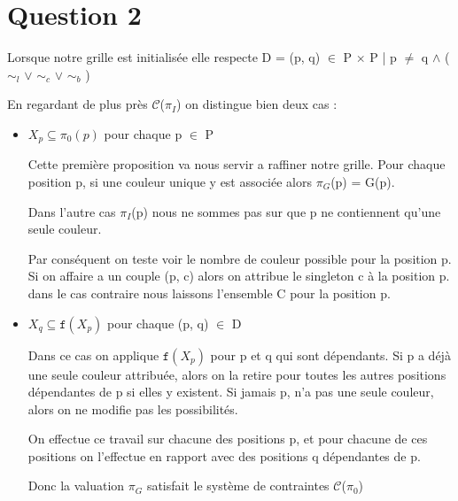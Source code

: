
\section{Question 2}

Lorsque notre grille est initialis\'ee elle respecte D = {(p, q) $\in$ P $\times$ P | p $\neq$ q $\wedge$ ( $\sim_{l}$ $\vee$ $\sim_{c}$ $\vee$ $\sim_{b}$ )}

En regardant de plus pr\`es $\mathcal{C}$($\pi_I$) on distingue bien deux cas :

\bigskip
\begin{itemize}
\item $X_p \subseteq \pi_0(p)$ pour chaque p $\in$ P

Cette premi\`ere proposition va nous servir a raffiner notre grille. Pour chaque position p, si une couleur unique y est associ\'ee alors $\pi_G$(p) = {G(p)}.


Dans l'autre cas $\pi_I$(p)  nous ne sommes pas sur que p ne contiennent qu'une seule couleur.  

\bigskip
Par cons\'equent on teste voir le nombre de couleur possible pour la position p. Si on affaire a un couple {(p, c)} alors on attribue le singleton {c} \`a la position p. dans le cas contraire nous laissons l'ensemble C pour la position p.

\bigskip
\item $X_q \subseteq \mathtt{f} (X_p)$ pour chaque (p, q) $\in$ D

Dans ce cas on applique $\mathtt{f} (X_p)$ pour p et q qui sont d\'ependants. Si p a d\'ej\`a une seule couleur attribu\'ee, alors on la retire pour toutes les autres positions d\'ependantes de p si elles y existent. Si jamais p, n'a pas une seule couleur, alors on ne modifie pas les possibilit\'es. 

\bigskip
On effectue ce travail sur chacune des positions p, et pour chacune de ces positions on l'effectue en rapport avec des positions q d\'ependantes de p.

Donc la valuation $\pi_G$ satisfait le syst\`eme de contraintes $\mathcal{C}$($\pi_0$)
\end{itemize}